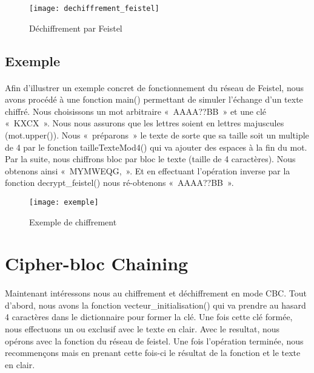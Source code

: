 \documentclass[11pt,fleqn]{book} %
\begin{document}
\begin{figure}[!h]
\centering\texttt{[image: dechiffrement\_feistel]}
\caption{Déchiffrement par Feistel}
\end{figure}


\subsection{Exemple}

\paragraph{}Afin d'illustrer un exemple concret de fonctionnement du réseau de Feistel, nous avons procédé à une fonction main() permettant de simuler l'échange d'un texte chiffré.
\vspace{0.5cm}Nous choisissons un mot arbitraire « AAAA??BB » et une clé « KXCX ». Nous nous assurons que les lettres soient en lettres majuscules (mot.upper()). Nous « préparons » le texte de sorte que sa taille soit un multiple de 4 par le fonction tailleTexteMod4() qui va ajouter des espaces à la fin du mot. Par la suite, nous chiffrons bloc par bloc le texte (taille de 4 caractères). Nous obtenons ainsi « MYMWEQG, ». Et en effectuant l'opération inverse par la fonction decrypt\_feistel() nous ré-obtenons « AAAA??BB ».

\begin{figure}[!h]
\centering\texttt{[image: exemple]}
\caption{Exemple de chiffrement}
\end{figure}


\section{Cipher-bloc Chaining}

\paragraph{}Maintenant intéressons nous au chiffrement et déchiffrement en mode CBC. Tout d'abord, nous avons la fonction vecteur\_initialisation() qui va prendre au hasard 4 caractères dans le dictionnaire pour former la clé. Une fois cette clé formée, nous effectuons un ou exclusif avec le texte en clair. Avec le resultat, nous opérons avec la fonction du réseau de feistel. Une fois l'opération terminée, nous recommençons mais en prenant cette fois-ci le résultat de la fonction et le texte en clair.
\end{document}
